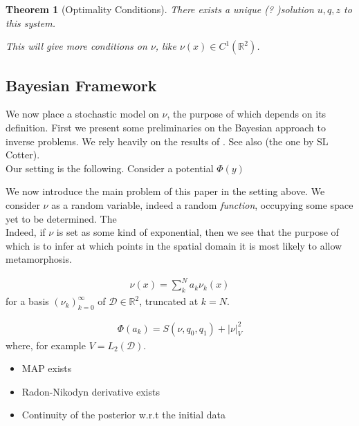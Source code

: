 \documentclass{article}
\newtheorem{theorem}{Theorem}
\begin{document}
\begin{theorem}[Optimality Conditions]
There exists a unique (? )solution $u, q, z$ to this system.

This will give more conditions on $\nu$, like $\nu(x) \in C^{1}(\mathbb R^2)$. 
\end{theorem}

\subsection{Bayesian Framework}\label{sec:bayesian}

We now place a stochastic model on $\nu$, the purpose of which depends on its
definition. First we present some preliminaries on the Bayesian approach to
inverse problems. We rely heavily on the results of \cite{dashti2017bayesian}.
See also (the one by SL Cotter).\\

Our setting is the following. Consider a potential $\Phi(y)$ 

We now introduce the main problem of this paper in the setting above. We
consider $\nu$ as a random variable, indeed a random \emph{function}, occupying
some space yet to be determined. The \\

Indeed, if $\nu$ is set as some kind of exponential, then we
see that 
the purpose of which is to infer at
which points in the spatial domain it is most likely to allow metamorphosis.
%

\begin{align}
	\nu(x) = \sum_k^N a_k \nu_k(x)
\end{align}
for a basis $(\nu_k)_{k=0}^\infty$ of $\mathcal D \in \mathbb R^2$, truncated at $k=N$.  

\begin{align}
	\Phi(a_k) = S(\nu,q_0,q_1) + |\nu|_V^2
\end{align}
where, for example $ V = {L_2(\mathcal D)}$. 

\begin{itemize}
	\item MAP exists
	\item Radon-Nikodyn derivative exists
	\item Continuity of the posterior w.r.t the initial data 
\end{itemize}
\end{document}
